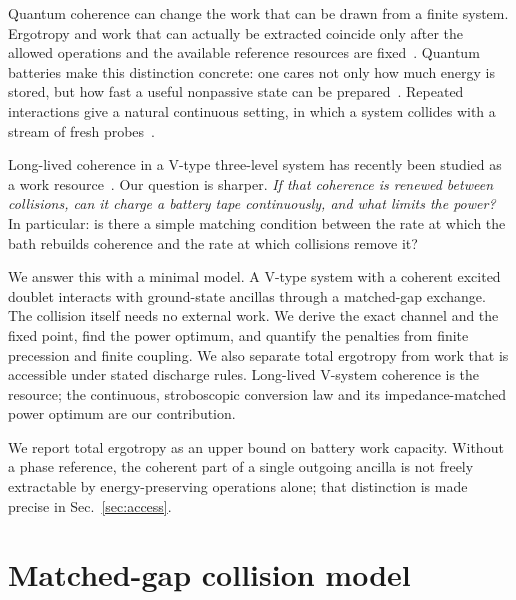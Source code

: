 \documentclass[aps,pre,twocolumn,groupedaddress,amsmath,amssymb,nofootinbib]{revtex4-2}
\begin{document}
Quantum coherence can change the work that can be drawn from a finite
system. Ergotropy and work that can actually be extracted coincide only
after the allowed operations and the available reference resources are
fixed~\cite{Allahverdyan2004,Francica2020,Lostaglio2015}. Quantum batteries
make this distinction concrete: one cares not only how much energy is
stored, but how fast a useful nonpassive state can be
prepared~\cite{AlickiFannes2013,Campaioli2017}. Repeated interactions give a
natural continuous setting, in which a system collides with a stream of
fresh probes~\cite{Bettmann2023,Prositto2025,CollisionalTransmon2025,NoGo2026}.

Long-lived coherence in a V-type three-level system has recently been
studied as a work resource~\cite{Chen2025}. Our question is sharper.
\emph{If that coherence is renewed between collisions, can it charge a
battery tape continuously, and what limits the power?} In particular: is
there a simple matching condition between the rate at which the bath
rebuilds coherence and the rate at which collisions remove it?

We answer this with a minimal model. A V-type system with a coherent
excited doublet interacts with ground-state ancillas through a matched-gap
exchange. The collision itself needs no external work. We derive the exact
channel and the fixed point, find the power optimum, and quantify the
penalties from finite precession and finite coupling. We also separate total
ergotropy from work that is accessible under stated discharge rules.
Long-lived V-system coherence is the resource; the continuous, stroboscopic
conversion law and its impedance-matched power optimum are our
contribution.

We report total ergotropy as an upper bound on battery work capacity.
Without a phase reference, the coherent part of a single outgoing ancilla
is not freely extractable by energy-preserving operations alone; that
distinction is made precise in Sec.~\ref{sec:access}.

\section{Matched-gap collision model}
\end{document}
